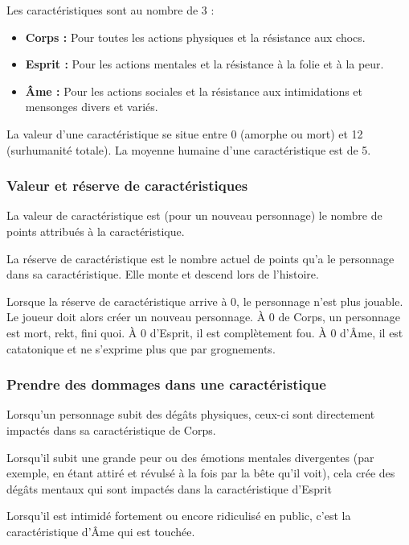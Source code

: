 Les caractéristiques sont au nombre de 3 :

\begin{itemize}
	\item \textbf{Corps :} Pour toutes les actions physiques et la résistance aux chocs.
	\item \textbf{Esprit :} Pour les actions mentales et la résistance à la folie et à la peur.
	\item \textbf{Âme :} Pour les actions sociales et la résistance aux intimidations et mensonges divers et variés.
\end{itemize}

La valeur d'une caractéristique se situe entre 0 (amorphe ou mort) et 12 (surhumanité totale). La moyenne humaine d'une caractéristique est de 5.

\subsubsection*{Valeur et réserve de caractéristiques}

La valeur de caractéristique est (pour un nouveau personnage) le nombre de points attribués à la caractéristique.

La réserve de caractéristique est le nombre actuel de points qu'a le personnage dans sa caractéristique. Elle monte et descend lors de l'histoire.

Lorsque la réserve de caractéristique arrive à 0, le personnage n'est plus jouable. Le joueur doit alors créer un nouveau personnage. À 0 de Corps, un personnage est mort, rekt, fini quoi. À 0 d'Esprit, il est complètement fou. À 0 d'Âme, il est catatonique et ne s'exprime plus que par grognements.

\subsubsection*{Prendre des dommages dans une caractéristique}

Lorsqu'un personnage subit des dégâts physiques, ceux-ci sont directement impactés dans sa caractéristique de Corps.

Lorsqu'il subit une grande peur ou des émotions mentales divergentes (par exemple, en étant attiré et révulsé à la fois par la bête qu'il voit), cela crée des dégâts mentaux qui sont impactés dans la caractéristique d'Esprit

Lorsqu'il est intimidé fortement ou encore ridiculisé en public, c'est la caractéristique d'Âme qui est touchée.

